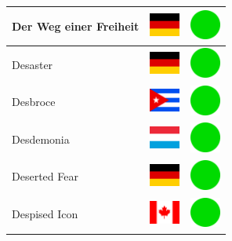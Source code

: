 \documentclass[12pt, a4paper, twoside]{report}
\begin{document}
\begin{center}
\begin{longtable}{|p{5cm}|p{2cm}|p{2cm}|}
 Der Weg einer Freiheit                                     & \includegraphics[width=1cm]{../img/flags/de} &   \includegraphics[width=1cm]{../likes/y} \\ \hline
 Desaster                                                   & \includegraphics[width=1cm]{../img/flags/de} &   \includegraphics[width=1cm]{../likes/y} \\ \hline
 Desbroce                                                   & \includegraphics[width=1cm]{../img/flags/cu} &   \includegraphics[width=1cm]{../likes/y} \\ \hline
 Desdemonia                                                 & \includegraphics[width=1cm]{../img/flags/lu} &   \includegraphics[width=1cm]{../likes/y} \\ \hline
 Deserted Fear                                              & \includegraphics[width=1cm]{../img/flags/de} &   \includegraphics[width=1cm]{../likes/y} \\ \hline
 Despised Icon                                              & \includegraphics[width=1cm]{../img/flags/ca} &   \includegraphics[width=1cm]{../likes/y} \\ \hline

\end{longtable}
\end{center}
\end{document}
